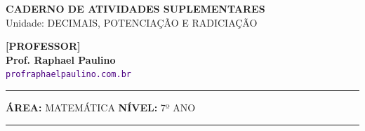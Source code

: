 \usepackage{titlesec}
\titleformat{\section}{\color{black}\large\bfseries}{\thesection}{0em}{\vspace{0.1cm}\titlerule[0.8pt]}
\titlespacing*{\section}{0pt}{10pt}{6pt} 
\titleformat{\subsubsection}[runin]{\color{black}\bfseries}{}{0em}{}
\titlespacing*{\subsubsection}{0pt}{0pt}{0.15cm}

\usepackage{multicol}
\setlength{\columnsep}{1cm}
\setlength{\columnseprule}{0.5pt}
\def\columnseprulecolor{\color{CorLinha}}
\usepackage{adjustbox, tikz, pgfplots, circuitikz}
\usetikzlibrary{shadows, shapes.misc, positioning, calc}
\pgfplotsset{compat=1.18}


\thispagestyle{empty}
\color{Cinzablack}
\vspace*{-1.8cm}

\noindent
\begin{minipage}{\textwidth}
    \selectfont
    \noindent
    \begin{minipage}[t]{0.65\linewidth}
        {\Large \bfseries \MakeUppercase{Caderno de Atividades Suplementares}}\\[0.1cm]
        {\large \textmd{\textcolor{CinzaEscuro}{Unidade: DECIMAIS, POTENCIAÇÃO E RADICIAÇÃO}}}
    \end{minipage}%
    \begin{minipage}[t]{0.35\linewidth}
        \raggedleft
        \ifgabarito
            {\large \bfseries \textcolor{CorTitUm}{[PROFESSOR]}}\\[0.05cm]
        \fi
        \small \textbf{Prof. Raphael Paulino}\\
        \textsf{\small \textcolor{indigo}{\texttt{profraphaelpaulino.com.br}}}
    \end{minipage}
    
    \vspace{0.15cm}
    \noindent\rule{\linewidth}{1.2pt}
    \vspace{-0.1cm}
    \footnotesize\textsf{\textbf{ÁREA:} MATEMÁTICA \hfill \textbf{NÍVEL:} 7º ANO}
    \vspace{0.1cm}
    \noindent\rule{\linewidth}{0.4pt}
\end{minipage}

